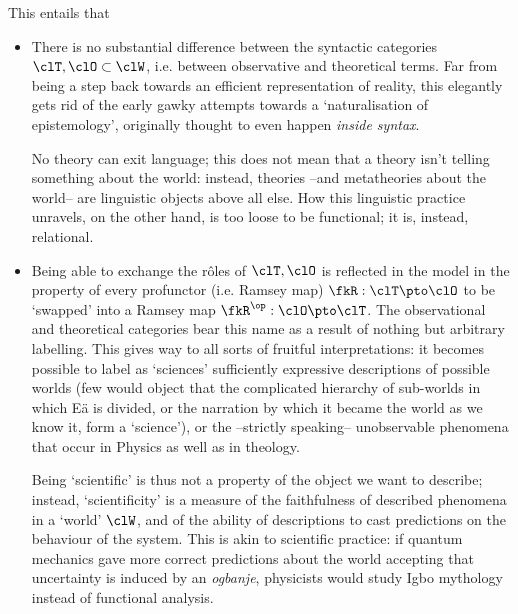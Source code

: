 This entails that
\begin{itemize}
  \item There is no substantial difference between the syntactic categories $\clT,\clO\subset \clW$, i.e. between observative and theoretical terms. Far from being a step back towards an efficient representation of reality, this elegantly gets rid of the early gawky attempts towards a `naturalisation of epistemology', originally thought to even happen \emph{inside syntax}.

        No theory can exit language; this does not mean that a theory isn't telling something about the world: instead, theories --and metatheories about the world-- are linguistic objects above all else. How this linguistic practice unravels, on the other hand, is too loose to be functional; it is, instead, relational.
  \item Being able to exchange the r\^oles of $\clT,\clO$ is reflected in the model in the property of every profunctor (i.e. Ramsey map) $\fkR : \clT \pto \clO$ to be `swapped' into a Ramsey map $\fkR^\op : \clO \pto \clT$. The observational and theoretical categories bear this name as a result of nothing but arbitrary labelling. This gives way to all sorts of fruitful interpretations: it becomes possible to label as `sciences' sufficiently expressive descriptions of possible worlds (few would object that the complicated hierarchy of sub-worlds in which Eä is divided, or the narration by which it became the world as we know it, form a `science'), or the --strictly speaking-- unobservable phenomena that occur in Physics as well as in theology.

        Being `scientific' is thus not a property of the object we want to describe; instead, `scientificity' is a measure of the faithfulness of described phenomena in a `world' $\clW$, and of the ability of descriptions to cast predictions on the behaviour of the system. This is akin to scientific practice: if quantum mechanics gave more correct predictions about the world accepting that uncertainty is induced by an \emph{ogbanje}, physicists would study Igbo mythology instead of functional analysis.

\end{itemize}
